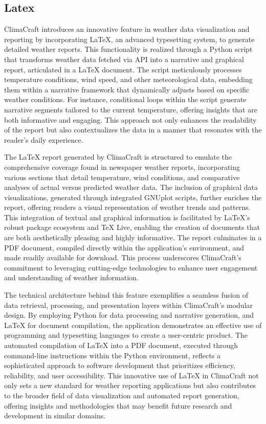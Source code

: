 \documentclass[sn-mathphys-num]{sn-jnl}%
\begin{document}
\subsection{Latex}\label{sec3.4}

ClimaCraft introduces an innovative feature in weather data visualization and reporting by incorporating LaTeX, an advanced typesetting system, to generate detailed weather reports. This functionality is realized through a Python script that transforms weather data fetched via API into a narrative and graphical report, articulated in a LaTeX document. The script meticulously processes temperature conditions, wind speed, and other meteorological data, embedding them within a narrative framework that dynamically adjusts based on specific weather conditions. For instance, conditional loops within the script generate narrative segments tailored to the current temperature, offering insights that are both informative and engaging. This approach not only enhances the readability of the report but also contextualizes the data in a manner that resonates with the reader's daily experience.

The LaTeX report generated by ClimaCraft is structured to emulate the comprehensive coverage found in newspaper weather reports, incorporating various sections that detail temperature, wind conditions, and comparative analyses of actual versus predicted weather data. The inclusion of graphical data visualizations, generated through integrated GNUplot scripts, further enriches the report, offering readers a visual representation of weather trends and patterns. This integration of textual and graphical information is facilitated by LaTeX's robust package ecosystem and TeX Live, enabling the creation of documents that are both aesthetically pleasing and highly informative. The report culminates in a PDF document, compiled directly within the application's environment, and made readily available for download. This process underscores ClimaCraft's commitment to leveraging cutting-edge technologies to enhance user engagement and understanding of weather information.

The technical architecture behind this feature exemplifies a seamless fusion of data retrieval, processing, and presentation layers within ClimaCraft's modular design. By employing Python for data processing and narrative generation, and LaTeX for document compilation, the application demonstrates an effective use of programming and typesetting languages to create a user-centric product. The automated compilation of LaTeX into a PDF document, executed through command-line instructions within the Python environment, reflects a sophisticated approach to software development that prioritizes efficiency, reliability, and user accessibility. This innovative use of LaTeX in ClimaCraft not only sets a new standard for weather reporting applications but also contributes to the broader field of data visualization and automated report generation, offering insights and methodologies that may benefit future research and development in similar domains.
\end{document}
